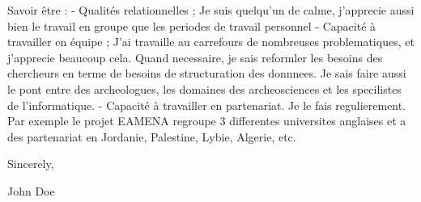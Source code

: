 \documentclass[12pt]{article}
\begin{document}
Savoir être :
- Qualités relationnelles ;
Je suis quelqu'un de calme, j'apprecie aussi bien le travail en groupe que les periodes de travail personnel
- Capacité à travailler en équipe ;
J'ai travaille au carrefours de nombreuses problematiques, et j'apprecie beaucoup cela. Quand necessaire, je sais reformler les besoins des chercheurs en terme de besoins de structuration des donnnees. Je sais faire aussi le pont entre des archeologues, les domaines des archeosciences et les specilistes de l'informatique.
- Capacité à travailler en partenariat.
Je le fais regulierement. Par exemple le projet EAMENA regroupe 3 differentes universites anglaises et a des partenariat en Jordanie, Palestine, Lybie, Algerie, etc. 

\vspace{12pt} %
Sincerely,

\vspace{48pt} %

John Doe %
\end{document}
